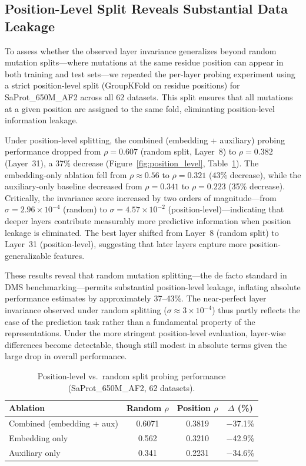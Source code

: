 \documentclass[11pt,a4paper]{article}
\begin{document}
\subsection{Position-Level Split Reveals Substantial Data Leakage}

To assess whether the observed layer invariance generalizes beyond random mutation
splits---where mutations at the same residue position can appear in both training
and test sets---we repeated the per-layer probing experiment using a strict
position-level split (GroupKFold on residue positions) for SaProt\_650M\_AF2
across all 62 datasets. This split ensures that all mutations at a given position
are assigned to the same fold, eliminating position-level information leakage.

Under position-level splitting, the combined (embedding + auxiliary) probing
performance dropped from $\rho = 0.607$ (random split, Layer~8) to
$\rho = 0.382$ (Layer~31), a 37\% decrease
(Figure~\ref{fig:position_level}, Table~\ref{tab:position_level}).
The embedding-only ablation fell from $\rho \approx 0.56$ to $\rho = 0.321$
(43\% decrease), while the auxiliary-only baseline decreased from
$\rho = 0.341$ to $\rho = 0.223$ (35\% decrease). Critically, the invariance
score increased by two orders of magnitude---from $\sigma = 2.96 \times 10^{-4}$
(random) to $\sigma = 4.57 \times 10^{-2}$ (position-level)---indicating that
deeper layers contribute measurably more predictive information when position
leakage is eliminated. The best layer shifted from Layer~8 (random split) to
Layer~31 (position-level), suggesting that later layers capture more
position-generalizable features.

These results reveal that random mutation splitting---the de facto standard in
DMS benchmarking---permits substantial position-level leakage, inflating
absolute performance estimates by approximately 37--43\%. The near-perfect layer
invariance observed under random splitting ($\sigma \approx 3 \times 10^{-4}$)
thus partly reflects the ease of the prediction task rather than a fundamental
property of the representations. Under the more stringent position-level
evaluation, layer-wise differences become detectable, though still modest in
absolute terms given the large drop in overall performance.

\begin{table}[ht]
\centering
\caption{Position-level vs.\ random split probing performance (SaProt\_650M\_AF2, 62 datasets).}
\label{tab:position_level}
\begin{tabular}{lccc}
\toprule
Ablation & Random $\rho$ & Position $\rho$ & $\Delta$ (\%) \\
\midrule
Combined (embedding + aux)  & 0.6071 & 0.3819 & $-$37.1\% \\
Embedding only              & 0.562  & 0.3210 & $-$42.9\% \\
Auxiliary only              & 0.341  & 0.2231 & $-$34.6\% \\
\bottomrule
\end{tabular}
\end{table}
\end{document}
